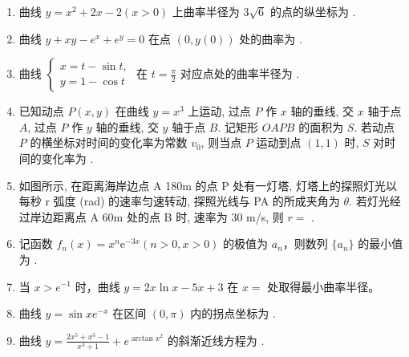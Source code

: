 \documentclass[12pt, a4paper]{ctexart}
\begin{document}
\begin{enumerate}[start=39]
    \item 曲线 $ y = x^{2} + 2x - 2 (x > 0) $ 上曲率半径为 $ 3\sqrt{6} $ 的点的纵坐标为 \underline{\hspace{2cm}}.

    \item 曲线 $ y + xy - e^{x} + e^{y} = 0 $ 在点 $ (0, y(0)) $ 处的曲率为 \underline{\hspace{2cm}}.

    \item 曲线 $ \begin{cases} x = t - \sin t, \\ y = 1 - \cos t \end{cases} $ 在 $ t = \frac{\pi}{2} $ 对应点处的曲率半径为 \underline{\hspace{2cm}}.

    \item 已知动点 $ P(x, y) $ 在曲线 $ y = x^{3} $ 上运动, 过点 $ P $ 作 $ x $ 轴的垂线, 交 $ x $ 轴于点 $ A $, 过点 $ P $ 作 $ y $ 轴的垂线, 交 $ y $ 轴于点 $ B $. 记矩形 $ OAPB $ 的面积为 $ S $. 若动点 $ P $ 的横坐标对时间的变化率为常数 $ v_{0} $, 则当点 $ P $ 运动到点 $ (1,1) $ 时, $ S $ 对时间的变化率为 \underline{\hspace{2cm}}.

    \item 如图所示, 在距离海岸边点 A 180m 的点 P 处有一灯塔, 灯塔上的探照灯光以每秒 r 弧度 (rad) 的速率匀速转动, 探照光线与 PA 的所成夹角为 $ \theta $. 若灯光经过岸边距离点 A 60m 处的点 B 时, 速率为 30 m/s, 则 $ r = $ \underline{\hspace{2cm}}.

    \item 记函数 $ f_{n}(x)=x^{n}\mathrm{e}^{-3x}(n>0,x>0) $ 的极值为 $ a_{n} $，则数列 $ \{a_{n}\} $ 的最小值为 \underline{\hspace{2cm}}.

    \item 当 $ x > e^{-1} $ 时，曲线 $ y = 2x \ln x - 5x + 3 $ 在 $ x = $ \underline{\hspace{2cm}} 处取得最小曲率半径。

    \item 曲线 $ y = \sin x e^{-x} $ 在区间 $ (0, \pi) $ 内的拐点坐标为 \underline{\hspace{2cm}}.

    \item 曲线 $ y=\frac{2x^{5}+x^{3}-1}{x^{4}+1}+e^{\arctan x^{2}} $ 的斜渐近线方程为 \underline{\hspace{2cm}}.
\end{enumerate}
\end{document}
